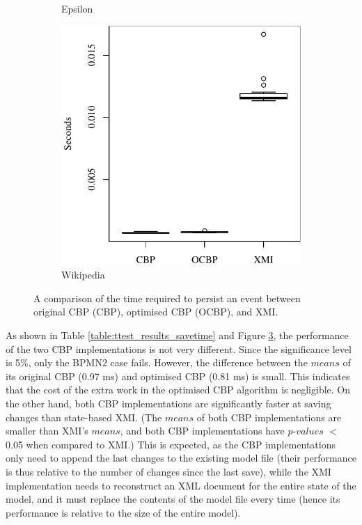 \begin{figure}[ht]
\begin{subfigure}{0.325\textwidth}
      \caption{Epsilon}
      \label{fig:save_time_epsilon}
    \end{subfigure}
    \hfill
    \begin{subfigure}{0.325\textwidth}
      \centering
      \includegraphics[width=\linewidth]{images/ol_save_time_wikipedia}
      \caption{Wikipedia}
      \label{fig:save_time_wikipedia}
    \end{subfigure}
    \caption{A comparison of the time required to persist an event between original CBP (CBP), optimised CBP (OCBP), and XMI.}
    \label{fig:savetime}
  \end{figure}
  
  
    As shown in Table \ref{table:ttest_results_savetime} and Figure \ref{fig:savetime}, the performance of the two CBP implementations is not very different. Since the significance level is 5\%, only the BPMN2 case fails. However, the difference between the $means$ of its original CBP (0.97 ms) and optimised CBP (0.81 ms) is small. This indicates that the cost of the extra work in the optimised CBP algorithm is negligible. On the other hand, both CBP implementations are significantly faster at saving changes than state-based XMI. (The $means$ of both CBP implementations are smaller than XMI’s $means$, and both CBP implementations have $p$-$values$ $<$ 0.05 when compared to XMI.) This is expected, as the CBP implementations only need to append the last changes to the existing model file (their performance is thus relative to the number of changes since the last save), while the XMI implementation needs to reconstruct an XML document for the entire state of the model, and it must replace the contents of the model file every time (hence its performance is relative to the size of the entire model).
    

